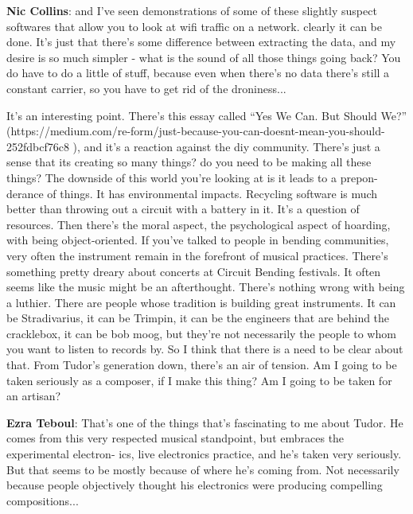 \textbf{Nic Collins}: and I’ve seen demonstrations of some of these slightly suspect softwares that allow you to look at wifi traffic on a network. clearly it can be done. It’s just that there’s some difference between extracting the data, and my desire is so much simpler - what is the sound of all those things going back? You do have to do a little of stuff, because even when there’s no data there’s still a constant carrier, so you have to get rid of the droniness...
					
It’s an interesting point. There’s this  essay called ``Yes We Can. But Should We?'' (https://medium.com/re-form/just-because-you-can-doesnt-mean-you-should-252fdbcf76c8 ), and it’s a reaction against the diy community. There’s just a sense that its creating so many things? do you need to be making all these things? The downside of this world you’re looking at is it leads to a prepon- derance of things. It has environmental impacts. Recycling software is much better than throwing out a circuit with a battery in it. It’s a question of resources. Then there’s the moral aspect, the psychological aspect of hoarding, with being object-oriented. If you’ve talked to people in bending communities, very often the instrument remain in the forefront of musical practices. There’s something pretty dreary about concerts at Circuit Bending festivals. It often seems like the music might be an afterthought. There’s nothing wrong with being a luthier. There are people whose tradition is building great instruments. It can be Stradivarius, it can be Trimpin, it can be the engineers that are behind the cracklebox, it can be bob moog, but they’re not necessarily the people to whom you want to listen to records by. So I think that there is a need to be clear about that. From Tudor’s generation down, there’s an air of tension. Am I going to be taken seriously as a composer, if I make this thing? Am I going to be taken for an artisan?
					
\textbf{Ezra Teboul}: That’s one of the things that’s fascinating to me about Tudor. He comes from this very respected musical standpoint, but embraces the experimental electron- ics, live electronics practice, and he’s taken very seriously. But that seems to be mostly because of where he’s coming from. Not necessarily because people objectively thought his electronics were producing compelling compositions...
					
